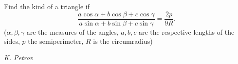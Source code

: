 Find the kind of a triangle if
$$\frac{a\cos\alpha+b\cos\beta+c\cos\gamma}{a\sin\alpha+b\sin\beta+c\sin\gamma}=\frac{2p}{9R}.$$($\alpha,\beta,\gamma$ are the measures of the angles, $a,b,c$ are the respective lengths of the sides, $p$ the semiperimeter, $R$ is the circumradius)

\textit{K. Petrov}